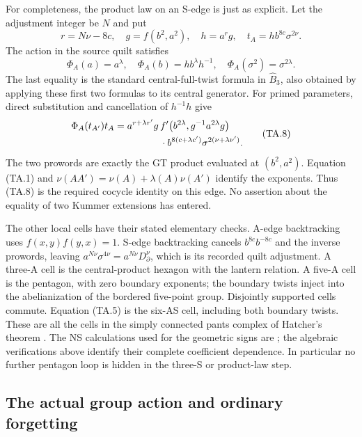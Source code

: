 For completeness, the product law on an S-edge is just as explicit.
Let the adjustment integer be $N$ and put
\[
 r=N\nu-8c,\quad g=f(b^2,a^2),\quad h=a^r g,
 \quad t_A=h b^{8c}\sigma^{2\nu}.
\]
The action in the source quilt satisfies
\[
 \Phi_A(a)=a^\lambda,\quad
 \Phi_A(b)=h b^\lambda h^{-1},\quad
 \Phi_A(\sigma^2)=\sigma^{2\lambda}.
\]
The last equality is the standard central-full-twist formula in
$\widehat B_3$, also obtained by applying these first two formulas
to its central generator.  For primed parameters, direct substitution
and cancellation of $h^{-1}h$ give
\[
\begin{split}
 \Phi_A(t_{A'})t_A
 ={}&a^{r+\lambda r'}g\,
 f'\bigl(b^{2\lambda},g^{-1}a^{2\lambda}g\bigr)\\
 &\hspace{12mm}\cdot b^{8(c+\lambda c')}
                   \sigma^{2(\nu+\lambda\nu')}.
\end{split}                                                     \tag{TA.8}
\]
The two prowords are exactly the GT product evaluated at
$(b^2,a^2)$.  Equation (TA.1) and
$\nu(AA')=\nu(A)+\lambda(A)\nu(A')$ identify the exponents.
Thus (TA.8) is the required cocycle identity on this edge.
No assertion about the equality of two Kummer extensions has entered.

The other local cells have their stated elementary checks.  A-edge
backtracking uses $f(x,y)f(y,x)=1$.  S-edge backtracking cancels
$b^{8c}b^{-8c}$ and the inverse prowords, leaving
$a^{N\nu}\sigma^{4\nu}=a^{N\nu}D_\partial^\nu$,
which is its recorded quilt adjustment.  A three-A cell is the
central-product hexagon with the lantern relation.  A five-A cell is
the pentagon, with zero boundary exponents; the boundary twists
inject into the abelianization of the bordered five-point group.
Disjointly supported cells commute.  Equation (TA.5) is the six-AS
cell, including both boundary twists.  These are all the cells in
the simply connected pants complex of Hatcher's theorem
\cite[Theorem~8.2]{ET_NS2000}.
The NS calculations used for the geometric signs are
\cite[Definition~7.2, Lemma~7.3 and Claim~8.3]{ET_NS2000};
the algebraic verifications above identify
their complete coefficient dependence.  In particular no further
pentagon loop is hidden in the three-S or product-law step.

\subsection{The actual group action and ordinary forgetting}

